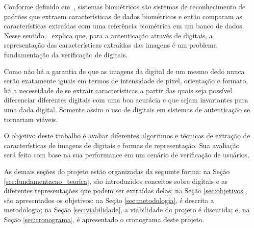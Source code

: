 Conforme definido em~\cite{Jain2004_IntroToBiometrics}, sistemas biométricos são sistemas de reconhecimento de padrões que extraem características de dados biométricos e então comparam as características extraídas com uma referência biométrica em um banco de dados. Nesse sentido,~ explica que, para a autenticação através de digitais, a representação das características extraídas das imagens é um problema fundamentação da verificação de digitais. 

Como não há a garantia de que as imagens da digital de um mesmo dedo nunca serão exatamente iguais em termos de intensidade de pixel, orientação e formato, há a necessidade de se extrair características a partir das quais seja possível diferenciar diferentes digitais com uma boa acurácia e que sejam invariantes para uma dada digital. Somente assim o uso de digitais em sistemas de autenticação se tornariam viáveis.

O objetivo deste trabalho é avaliar diferentes algoritmos e técnicas de extração de características de imagens de digitais e formas de representação. Sua avaliação será feita com base na sua performance em um cenário de verificação de usuários.

As demais seções do projeto estão organizadas da seguinte forma: na Seção \ref{sec:fundamentacao_teorica}, são introduzidos conceitos sobre digitais e as diferentes representações que podem ser extraídas delas; na Seção \ref{sec:objetivos}, são apresentados os objetivos; na Seção \ref{sec:metodologia}, é descrita a metodologia; na Seção \ref{sec:viabilidade}, a viabilidade do projeto é discutida; e, na Seção \ref{sec:cronograma}, é apresentado o cronograma deste projeto.
